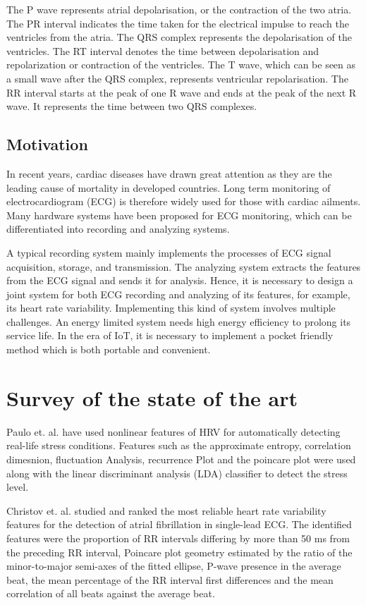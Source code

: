\documentclass[11pt]{article}
\theoremstyle{definition}
\begin{document}
  The P wave represents atrial depolarisation, or the contraction of the two atria.
  The PR interval indicates the time taken for the electrical impulse to reach the ventricles from the atria.
  The QRS complex represents the depolarisation of the ventricles.
  The RT interval denotes the time between depolarisation and repolarization or contraction of the ventricles.
  The T wave, which can be seen as a small wave after the QRS complex, represents ventricular repolarisation.
  The RR interval starts at the peak of one R wave and ends at the peak of the next R wave. It represents the time between two QRS complexes.

  \subsection{Motivation}
  In recent years, cardiac diseases have drawn great attention as they are the leading cause of mortality in developed countries.
  Long term monitoring of electrocardiogram (ECG) is therefore widely used for those with cardiac ailments.
  Many hardware systems have been proposed for ECG monitoring, which can be differentiated into recording and analyzing systems.

  A typical recording system mainly implements the processes of ECG signal acquisition, storage, and transmission.
  The analyzing system extracts the features from the ECG signal and sends it for analysis.
  Hence, it is necessary to design a joint system for both ECG recording and analyzing of its features, for example, its heart rate variability. Implementing this kind of system involves multiple challenges.
  An energy limited system needs high energy efficiency to prolong its service life.
  In the era of IoT, it is necessary to implement a pocket friendly method which is both portable and convenient.


  \section{Survey of the state of the art}
  Paulo et. al.\cite{melillo2011nonlinear} have used nonlinear features of HRV for automatically detecting real-life stress conditions. Features such as the approximate entropy, correlation dimesnion, fluctuation Analysis, recurrence Plot and the poincare plot were used along with the linear discriminant analysis (LDA) classifier to detect the stress level.

  Christov et. al. \cite{christov2018ranking} studied and ranked the most reliable heart rate variability features for the detection of atrial fibrillation in single-lead ECG. The identified features were the proportion of RR intervals differing by more than 50 ms from the preceding RR interval, Poincare plot geometry estimated by the ratio of the minor-to-major semi-axes of the fitted ellipse, P-wave presence in the average beat, the mean percentage of the RR interval first differences and the mean correlation of all beats against the average beat.
\end{document}

